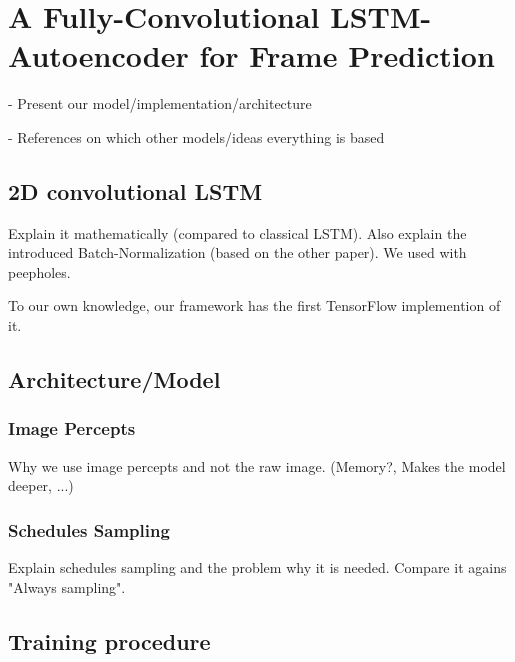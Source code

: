 
\chapter{A Fully-Convolutional LSTM-Autoencoder for Frame Prediction} \label{chapter:implementation}

- Present our model/implementation/architecture

- References on which other models/ideas everything is based

\section{2D convolutional LSTM}

Explain it mathematically (compared to classical LSTM).
Also explain the introduced Batch-Normalization (based on the other paper).
We used with peepholes.

To our own knowledge, our framework has the first TensorFlow implemention of it.


\section{Architecture/Model}



\subsection{Image Percepts}

Why we use image percepts and not the raw image.
(Memory?, Makes the model deeper, ...)

\subsection{Schedules Sampling}

Explain schedules sampling and the problem why it is needed. Compare it agains "Always sampling".


\section{Training procedure}


